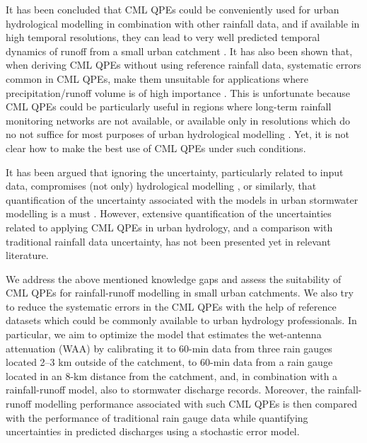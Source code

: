 \documentclass{ctuthesis}\usepackage[]{graphicx}\usepackage[]{color}
\begin{document}
It has been concluded that CML QPEs could be conveniently used for urban hydrological modelling
in combination with other rainfall data, and if available in high temporal resolutions, they can lead to very well predicted temporal dynamics of runoff from a small urban catchment  \citep{dischImpactDifferentSources2019, stranskyRunoffPredictionUsing2018}. It has also been shown that, when deriving CML QPEs without using reference rainfall data, systematic errors common in CML QPEs, make them unsuitable for applications where precipitation/runoff volume is of high importance \citep[][Chapter \ref{chap5}]{pastorekCommercialMicrowaveLinks2019}. This is unfortunate because CML QPEs could be particularly useful in regions where long-term rainfall monitoring networks are not available, or available only in resolutions which do no not suffice for most purposes of urban hydrological modelling \citep{gossetImprovingRainfallMeasurement2016}. Yet, it is not clear how to make the best use of  CML QPEs under such conditions.

It has been argued that ignoring the uncertainty, particularly related to input data, compromises (not only) hydrological modelling \citep{beven2006undermining, kavetskiBayesianAnalysisInput2006}, or similarly, that quantification of the uncertainty associated with the models in urban stormwater modelling is a must \citep{dotto2012comparison}. However, extensive quantification of the uncertainties related to applying CML QPEs in urban hydrology, and a comparison with traditional rainfall data uncertainty, has not been presented yet in relevant literature.

We address the above mentioned knowledge gaps and assess the suitability of CML QPEs for rainfall-runoff modelling in small urban catchments. We also try to reduce the systematic errors in the CML QPEs with the help of reference datasets which could be commonly available to urban hydrology professionals. In particular, we aim to optimize the model that estimates the wet-antenna attenuation (WAA) by calibrating it to 60-min data from three rain gauges located 2–3 km outside of the catchment, to 60-min data from a rain gauge located in an 8-km distance from the catchment, and, in combination with a rainfall-runoff model, also to stormwater discharge records. Moreover, the rainfall-runoff modelling performance associated with such CML QPEs is then compared with the performance of traditional rain gauge data while quantifying uncertainties in predicted discharges using a stochastic error model.
\end{document}

